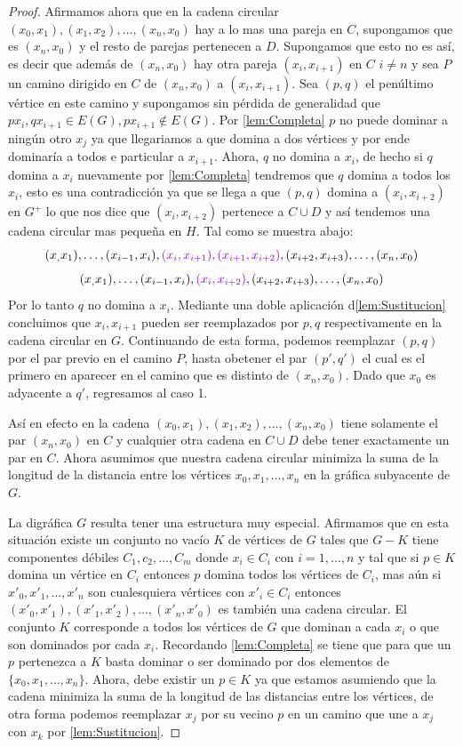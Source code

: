 \begin{proof}
Afirmamos ahora que en la cadena circular $(x_0,x_1),(x_1,x_2),\dots ,
(x_n,x_0)$ hay a lo mas una pareja en $C$, supongamos que es $(x_n,x_0)$ y el
resto de parejas pertenecen a $D$. Supongamos que esto no es así, es decir que
adem\'as de $(x_n,x_0)$ hay otra pareja $(x_i,x_{i+1})$ en $C$ $i\neq n$ y sea
$P$ un camino dirigido en $C$ de $(x_n,x_0)$ a $(x_i,x_{i+1})$. Sea $(p,q)$ el
penúltimo v\'ertice en este camino y supongamos sin p\'erdida de generalidad que
$px_i,qx_{i+1}\in E(G), px_{i+1}\notin E(G)$. Por \cref{lem:Completa} $p$ no
puede dominar a ningún otro $x_j$ ya que llegariamos a que domina a dos
v\'ertices y por ende dominaría a todos e particular a $x_{i+1}$. Ahora, $q$ no
domina a $x_i$, de hecho si $q$ domina a $x_i$ nuevamente por
\cref{lem:Completa} tendremos que $q$ domina a todos los $x_i$, esto es una
contradicci\'on ya que se llega a que $(p,q)$ domina a $(x_i,x_{i+2})$ en $G^+$
lo que nos dice que $(x_i,x_{i+2})$ pertenece a $C\cup D$ y así tendemos una
cadena circular mas pequeña en $H$. Tal como se muestra abajo:
$$ (x_,x_1), \dots , (x_{i-1},x_i ), {\color{malva} (x_i,x_{i+1}),
(x_{i+1},x_{i+2})},(x_{i+2},x_{i+3}), \dots , (x_n,x_0) $$
$$ (x_,x_1), \dots , (x_{i-1},x_i ), {\color{malva}
(x_i,x_{i+2})},(x_{i+2},x_{i+3}), \dots , (x_n,x_0) $$ Por lo tanto $q$ no
domina a $x_i$. Mediante una doble aplicaci\'on d\cref{lem:Sustitucion}
concluimos que $x_i,x_{i+1}$ pueden ser reemplazados por $p,q$ respectivamente
en la cadena circular en $G$. Continuando de esta forma, podemos reemplazar
$(p,q)$ por el par previo en el camino $P$, hasta obetener el par $(p',q')$ el
cual es el primero en aparecer en el camino que es distinto de $(x_n,x_0)$. Dado
que $x_0$ es adyacente a $q'$, regresamos al caso 1.

Así en efecto en la cadena $(x_0,x_1),(x_1,x_2),\dots,(x_n,x_0)$ tiene solamente
el par $(x_n,x_0)$ en $C$ y cualquier otra cadena en $C\cup D$ debe tener
exactamente un par en $C$. Ahora asumimos que nuestra cadena circular minimiza
la suma de la longitud de la distancia entre los vértices $x_0,x_1,\dots ,x_n$
en la gráfica subyacente de $G$.

La digráfica $G$ resulta tener una estructura muy especial. Afirmamos que en
esta situación existe un conjunto no vac\'io $K$ de vértices de $G$ tales que
$G-K$ tiene componentes d\'ebiles $C_1,c_2,\dots,C_m$ donde $x_i\in C_i$ con
$i=1,\dots,n$ y tal que si $p\in K$ domina un vértice en $C_i$ entonces $p$
domina todos los vértices de $C_i$, mas aún si $x'_0,x'_1,\dots,x'_n$ son
cualesquiera vértices con $x'_i\in C_i$ entonces
$(x'_0,x'_1),(x'_1,x'_2),\dots,(x'_n,x'_0)$ es también una cadena circular. El
conjunto $K$ corresponde a todos los vértices de $G$ que dominan a cada $x_i$ o
que son dominados por cada $x_i$. Recordando \cref{lem:Completa} se tiene que
para que un $p$ pertenezca a $K$ basta dominar o ser dominado por dos elementos
de $\{x_0,x_1,\dots,x_n \}$. Ahora, debe existir un $p\in K$ ya que
estamos asumiendo que la cadena minimiza la suma de la longitud de las
distancias entre los v\'ertices, de otra forma podemos reemplazar $x_j$ por su
vecino $p$ en un camino que une a $x_j$ con $x_k$ por \cref{lem:Sustitucion}.


\end{proof}
